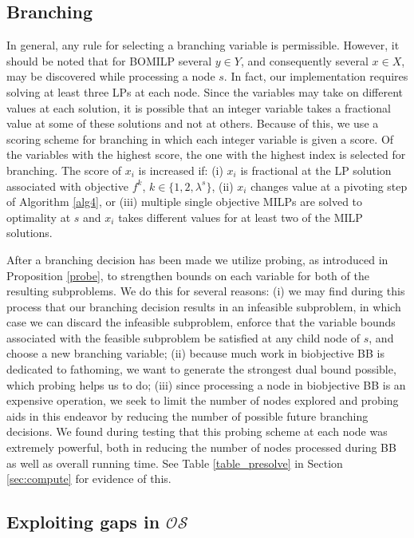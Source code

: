 \documentclass[11.5pt]{article}
\newcommand{\OS}{\mathcal{OS}}
\begin{document}
\subsection{Branching}\label{sec:branch}
In general, any rule for selecting a branching variable is permissible. However, it should be noted that for BOMILP several $y \in {Y}$, and consequently several $x\in {X}$, may be discovered while processing a node $s$. In fact, our implementation requires solving at least three LPs at each node. Since the variables may take on different values at each solution, it is possible that an integer variable takes a fractional value at some of these solutions and not at others. Because of this, we use a scoring scheme for branching in which each integer variable is given a score. Of the variables with the highest score, the one with the highest index is selected for branching. The score of $x_i$ is increased if: (i) $x_i$ is fractional at the LP solution associated with objective $f^k$, $k \in \{1,2,\lambda^s\}$, (ii) $x_i$ changes value at a pivoting step of Algorithm \ref{alg4}, or (iii) multiple single objective MILPs are solved to optimality at $s$ and $x_i$ takes different values for at least two of the MILP solutions.

After a branching decision has been made we utilize probing, as introduced in Proposition \ref{probe}, to strengthen bounds on each variable for both of the resulting subproblems. We do this for several reasons: (i) we may find during this process that our branching decision results in an infeasible subproblem, in which case we can discard the infeasible subproblem, enforce that the variable bounds associated with the feasible subproblem be satisfied at any child node of $s$, and choose a new branching variable; (ii) because much work in biobjective BB is dedicated to fathoming, we want to generate the strongest dual bound possible, which probing helps us to do; (iii) since processing a node in biobjective BB is an expensive operation, we seek to limit the number of nodes explored and probing aids in this endeavor by reducing the number of possible future branching decisions. We found during testing that this probing scheme at each node was extremely powerful, both in reducing the number of nodes processed during BB as well as overall running time. See Table \ref{table_presolve} in Section \ref{sec:compute} for evidence of this.


\subsection{Exploiting gaps in $\OS$}\label{sec:osgap}
\end{document}
